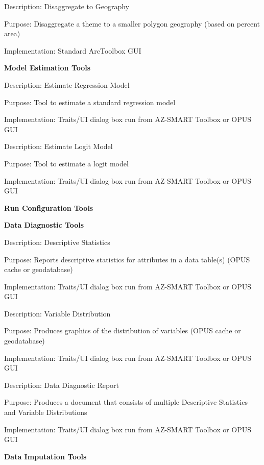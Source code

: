 \bigskip

Description: Disaggregate to Geography

Purpose: Disaggregate a theme to a smaller polygon geography (based on percent area)

Implementation: Standard ArcToolbox GUI

\bigskip

\textbf{Model Estimation Tools}

Description: Estimate Regression Model

Purpose: Tool to estimate a standard regression model

Implementation: Traits/UI dialog box run from AZ-SMART Toolbox or OPUS GUI

\bigskip

Description: Estimate Logit Model

Purpose: Tool to estimate a logit model

Implementation: Traits/UI dialog box run from AZ-SMART Toolbox or OPUS GUI

\bigskip

\textbf{Run Configuration Tools}

\bigskip

\textbf{Data Diagnostic Tools}

\bigskip

Description: Descriptive Statistics

Purpose: Reports descriptive statistics for attributes in a data table(s) (OPUS cache or geodatabase)

Implementation: Traits/UI dialog box run from AZ-SMART Toolbox or OPUS GUI

\bigskip

Description: Variable Distribution

Purpose: Produces graphics of the distribution of variables (OPUS cache or geodatabase)

Implementation: Traits/UI dialog box run from AZ-SMART Toolbox or OPUS GUI

\bigskip

Description: Data Diagnostic Report

Purpose: Produces a document that consists of multiple Descriptive Statistics and Variable Distributions

Implementation: Traits/UI dialog box run from AZ-SMART Toolbox or OPUS GUI

\bigskip

\textbf{Data Imputation Tools}

\bigskip


